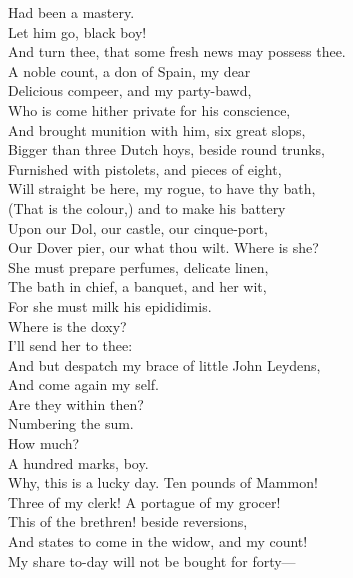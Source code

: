 \documentclass[a4paper,oneside]{memoir}
\begin{document}
\begin{drama*}
Had been a mastery.\\
\facespeaks {} Let him go, black boy!\\
And turn thee, that some fresh news may possess thee.\\
A noble count, a don of Spain, my dear\\
Delicious compeer, and my party-bawd,\\
Who is come hither private for his conscience,\\
And brought munition with him, six great slops,\\
Bigger than three Dutch hoys, beside round trunks,\\
Furnished with pistolets, and pieces of eight,\\
Will straight be here, my rogue, to have thy bath,\\
(That is the colour,) and to make his battery\\
Upon our Dol, our castle, our cinque-port,\\
Our Dover pier, our what thou wilt. Where is she?\\
She must prepare perfumes, delicate linen,\\
The bath in chief, a banquet, and her wit,\\
For she must milk his epididimis.\\
Where is the doxy?\\
\subtlespeaks {} I'll send her to thee:\\
And but despatch my brace of little John Leydens,\\
And come again my self.\\
\facespeaks {} Are they within then?\\
\subtlespeaks Numbering the sum.\\
\facespeaks {} How much?\\
\subtlespeaks {} A hundred marks, boy.\\
\facespeaks Why, this is a lucky day. Ten pounds of Mammon!\\
Three of my clerk! A portague of my grocer!\\
This of the brethren! beside reversions,\\
And states to come in the widow, and my count!\\
My share to-day will not be bought for forty---\\

\end{drama*}
\end{document}
